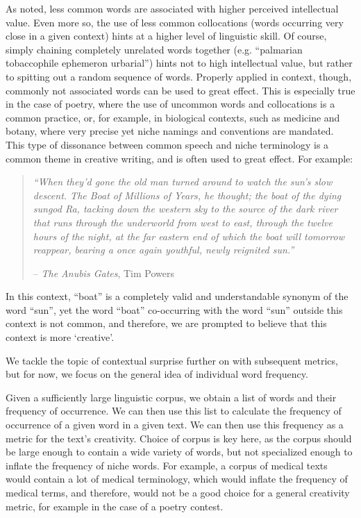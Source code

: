 As noted, less common words are associated with higher perceived intellectual value. Even more so, the use of less common collocations (words occurring very close in a given context) hints at a higher level of linguistic skill. Of course, simply chaining completely unrelated words together (e.g. ``palmarian tobaccophile ephemeron urbarial'') hints not to high intellectual value, but rather to spitting out a random sequence of words. Properly applied in context, though, commonly not associated words can be used to great effect. This is especially true in the case of poetry, where the use of uncommon words and collocations is a common practice, or, for example, in biological contexts, such as medicine and botany, where very precise yet niche namings and conventions are mandated. This type of dissonance between common speech and niche terminology is a common theme in creative writing, and is often used to great effect. For example:

\begin{quote}
    \textit{``When they'd gone the old man turned around to watch the sun's slow descent. The Boat of Millions of Years, he thought; the boat of the dying sungod Ra, tacking down the western sky to the source of the dark river that runs through the underworld from west to east, through the twelve hours of the night, at the far eastern end of which the boat will tomorrow reappear, bearing a once again youthful, newly reignited sun.''}
    \begin{flushright}
        -- \textit{The Anubis Gates}, Tim Powers
    \end{flushright}
\end{quote}
In this context, ``boat'' is a completely valid and understandable synonym of the word ``sun'', yet the word ``boat'' co-occurring with the word ``sun'' outside this context is not common, and therefore, we are prompted to believe that this context is more `creative'.

We tackle the topic of contextual surprise further on with subsequent metrics, but for now, we focus on the general idea of individual word frequency. 

Given a sufficiently large linguistic corpus, we obtain a list of words and their frequency of occurrence. We can then use this list to calculate the frequency of occurrence of a given word in a given text. We can then use this frequency as a metric for the text's creativity. Choice of corpus is key here, as the corpus should be large enough to contain a wide variety of words, but not specialized enough to inflate the frequency of niche words. For example, a corpus of medical texts would contain a lot of medical terminology, which would inflate the frequency of medical terms, and therefore, would not be a good choice for a general creativity metric, for example in the case of a poetry contest.

